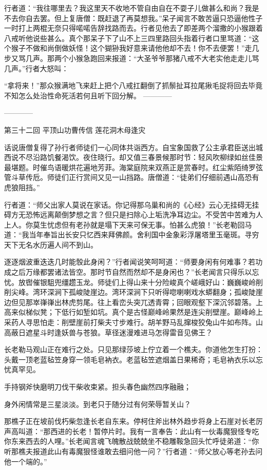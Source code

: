 \documentclass[12pt,UTF8]{ctexbook}
\begin{document}
行者道：“我往哪里去？我这里天不收地不管自由自在不耍子儿做甚么和尚？我是不去你自去罢。但上复唐僧：既赶退了再莫想我。”呆子闻言不敢苦逼只恐逼他性子一时打上两棍无奈只得喏喏告辞找路而去。行者见他去了即差两个溜撒的小猴跟着八戒听他说些甚么。真个那呆子下了山不上三四里路回头指着行者口里骂道：“这个猴子不做和尚倒做妖怪！这个猢狲我好意来请他他却不去！你不去便罢！”走几步又骂几声。那两个小猴急跑回来报道：“大圣爷爷那猪八戒不大老实他走走儿骂几声。”行者大怒叫：

“拿将来！”那众猴满地飞来赶上把个八戒扛翻倒了抓鬃扯耳拉尾揪毛捉将回去毕竟不知怎么处治性命死活若何且听下回分解。
------------


------------

第三十二回 平顶山功曹传信 莲花洞木母逢灾

话说唐僧复得了孙行者师徒们一心同体共诣西方。自宝象国救了公主承君臣送出城西说不尽沿路饥餐渴饮。夜住晓行。却又值三春景候那时节：轻风吹柳绿如丝佳景最堪题。时催鸟语暖烘花遍地芳菲。海棠庭院来双燕正是赏春时。红尘紫陌绮罗弦管斗草传卮。师徒们正行赏间又见一山挡路。唐僧道：“徒弟们仔细前遇山高恐有虎狼阻挡。”

行者道：“师父出家人莫说在家话。你记得那乌巢和尚的《心经》云心无挂碍无挂碍方无恐怖远离颠倒梦想之言？但只是扫除心上垢洗净耳边尘。不受苦中苦难为人上人。你莫生忧虑但有老孙就是塌下天来可保无事。怕甚么虎狼！”长老勒回马道：“我当年奉旨出长安只忆西来拜佛颜。舍利国中金象彩浮屠塔里玉毫斑。寻穷天下无名水历遍人间不到山。

逐逐烟波重迭迭几时能彀此身闲？”行者闻说笑呵呵道：“师要身闲有何难事？若功成之后万缘都罢诸法皆空。那时节自然而然却不是身闲也？”长老闻言只得乐以忘忧。放辔催银駔兜缰趱玉龙。师徒们上得山来十分险峻真个嵯峨好山：巍巍峻岭削削尖峰。湾环深涧下孤峻陡崖边。湾环深涧下只听得唿喇喇戏水蟒翻身；孤峻陡崖边但见那崒嵂嵂出林虎剪尾。往上看峦头突兀透青霄；回眼观壑下深沉邻碧落。上高来似梯似凳；下低行如堑如坑。真个是古怪巅峰岭果然是连尖削壁崖。巅峰岭上采药人寻思怕走：削壁崖前打柴夫寸步难行。胡羊野马乱撺梭狡兔山牛如布阵。山高蔽日遮星斗时逢妖兽与苍狼。草径迷漫难进马怎得雷音见佛王？

长老勒马观山正在难行之处。只见那绿莎坡上佇立着一个樵夫。你道他怎生打扮：头戴一顶老蓝毡笠身穿一领毛皂衲衣。老蓝毡笠遮烟盖日果稀奇；毛皂衲衣乐以忘忧真罕见。

手持钢斧快磨明刀伐干柴收束紧。担头春色幽然四序融融；

身外闲情常是三星淡淡。到老只于随分过有何荣辱暂关山？

那樵子正在坡前伐朽柴忽逢长老自东来。停柯住斧出林外趋步将身上石崖对长老厉声高叫道：“那西进的长老！暂停片时。我有一言奉告：此山有一伙毒魔狠怪专吃你东来西去的人哩。”长老闻言魂飞魄散战兢兢坐不稳雕鞍急回头忙呼徒弟道：“你听那樵夫报道此山有毒魔狠怪谁敢去细问他一问？”行者道：“师父放心等老孙去问他一个端的。”
\end{document}
